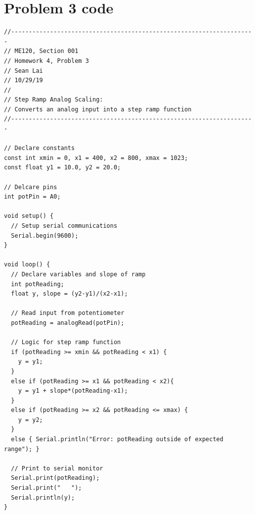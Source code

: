 \documentclass{article}
\begin{document}
\section*{Problem 3 code}
\begin{verbatim}
//---------------------------------------------------------------------
// ME120, Section 001
// Homework 4, Problem 3
// Sean Lai
// 10/29/19
//
// Step Ramp Analog Scaling:
// Converts an analog input into a step ramp function
//---------------------------------------------------------------------

// Declare constants
const int xmin = 0, x1 = 400, x2 = 800, xmax = 1023;
const float y1 = 10.0, y2 = 20.0;

// Delcare pins
int potPin = A0;

void setup() {
  // Setup serial communications
  Serial.begin(9600);
}

void loop() {
  // Declare variables and slope of ramp
  int potReading;
  float y, slope = (y2-y1)/(x2-x1);

  // Read input from potentiometer
  potReading = analogRead(potPin);

  // Logic for step ramp function
  if (potReading >= xmin && potReading < x1) {
    y = y1;
  }
  else if (potReading >= x1 && potReading < x2){
    y = y1 + slope*(potReading-x1);
  }
  else if (potReading >= x2 && potReading <= xmax) {
    y = y2;
  }
  else { Serial.println("Error: potReading outside of expected range"); }

  // Print to serial monitor
  Serial.print(potReading);
  Serial.print("   ");
  Serial.println(y);
}

\end{verbatim}
\end{document}
